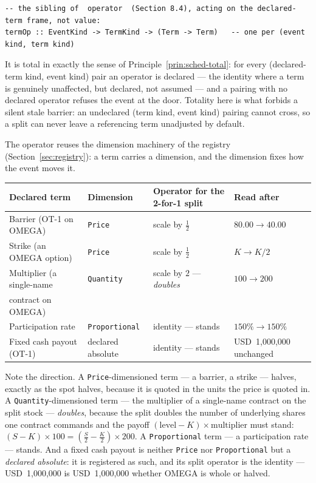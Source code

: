 \documentclass[11pt,a4paper]{article}
\newcommand{\USD}[1]{\mbox{USD~#1}}
\begin{document}
\begin{lstlisting}
-- the sibling of  operator  (Section 8.4), acting on the declared-term frame, not value:
termOp :: EventKind -> TermKind -> (Term -> Term)   -- one per (event kind, term kind)
\end{lstlisting}

It is total in exactly the sense of Principle~\ref{prin:sched-total}: for every
(declared-term kind, event kind) pair an operator is declared --- the identity where a term
is genuinely unaffected, but declared, not assumed --- and a pairing with no declared operator
refuses the event at the door. Totality here is what forbids a silent stale barrier: an
undeclared (term kind, event kind) pairing cannot cross, so a split can never leave a
referencing term unadjusted by default.

The operator reuses the dimension machinery of the registry (Section~\ref{sec:registry}): a
term carries a dimension, and the dimension fixes how the event moves it.

\begin{center}
\begin{tabular}{@{}llll@{}}
\toprule
Declared term & Dimension & Operator for the 2-for-1 split & Read after \\
\midrule
Barrier (OT-1 on OMEGA)          & \texttt{Price}        & scale by $\tfrac12$             & $80.00 \rightarrow 40.00$ \\
Strike (an OMEGA option)         & \texttt{Price}        & scale by $\tfrac12$             & $K \rightarrow K/2$ \\
Multiplier (a single-name        & \texttt{Quantity}     & scale by $2$ --- \emph{doubles} & $100 \rightarrow 200$ \\
\quad contract on OMEGA)         &                       &                                & \\
Participation rate               & \texttt{Proportional} & identity --- stands             & $150\% \rightarrow 150\%$ \\
Fixed cash payout (OT-1)         & declared absolute     & identity --- stands             & \USD{1{,}000{,}000} unchanged \\
\bottomrule
\end{tabular}
\end{center}

Note the direction. A \texttt{Price}-dimensioned term --- a barrier, a strike --- halves,
exactly as the spot halves, because it is quoted in the units the price is quoted in. A
\texttt{Quantity}-dimensioned term --- the multiplier of a single-name contract on the split
stock --- \emph{doubles}, because the split doubles the number of underlying shares one
contract commands and the payoff $(\text{level} - K)\times\text{multiplier}$ must stand:
$(S - K)\times 100 = (\tfrac{S}{2} - \tfrac{K}{2})\times 200$. A \texttt{Proportional} term
--- a participation rate --- stands. And a fixed cash payout is neither \texttt{Price} nor
\texttt{Proportional} but a \emph{declared absolute}: it is registered as such, and its split
operator is the identity --- \USD{1{,}000{,}000} is \USD{1{,}000{,}000} whether OMEGA is whole
or halved.
\end{document}
